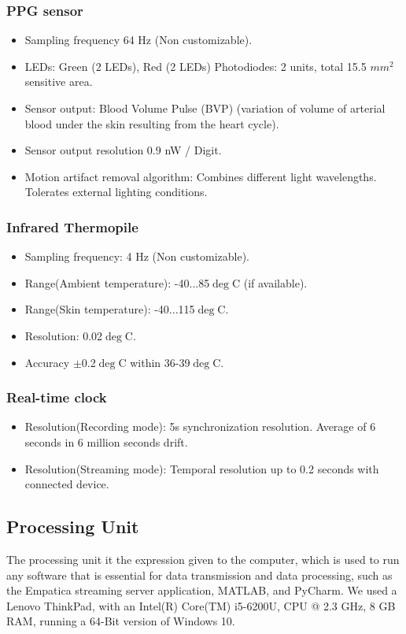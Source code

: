 \subsubsection{PPG sensor}
\begin{itemize}
\item Sampling frequency 64 Hz (Non customizable).
\item LEDs: Green (2 LEDs), Red (2 LEDs) Photodiodes: 2
units, total 15.5 $mm^{2}$ sensitive area.
\item Sensor output: Blood Volume Pulse (BVP) (variation
of volume of arterial blood under the skin resulting
from the heart cycle).
\item Sensor output resolution 0.9 nW / Digit.
\item Motion artifact removal algorithm: Combines different light wavelengths. Tolerates external lighting conditions.
\end{itemize}

\subsubsection{Infrared Thermopile}
\begin{itemize}
\item Sampling frequency: 4 Hz (Non customizable).
\item Range(Ambient temperature): -40...85$\deg$C (if available).
\item Range(Skin temperature): -40...115$\deg$C.
\item Resolution: 0.02$\deg$C.
\item Accuracy $\pm$0.2$\deg$C within 36-39$\deg$C.
\end{itemize}

\subsubsection{Real-time clock}
\begin{itemize}
\item Resolution(Recording mode): 5s synchronization resolution. Average of 6 seconds in 6 million seconds drift.
\item Resolution(Streaming mode): Temporal resolution up to 0.2 seconds with connected device.
\end{itemize}

\subsection{Processing Unit}
The processing unit it the expression given to the computer, which is used to run any software that is essential for data transmission and data processing, such as the Empatica streaming server application, MATLAB, and PyCharm. We used a Lenovo ThinkPad, with an Intel(R) Core(TM) i5-6200U, CPU @ 2.3 GHz, 8 GB RAM, running a 64-Bit version of Windows 10. 


